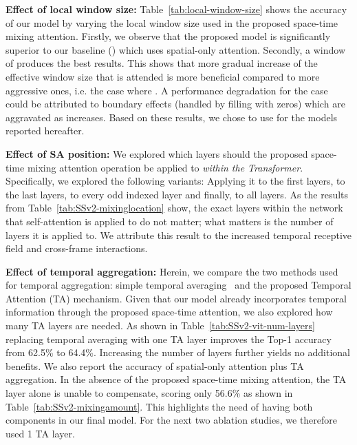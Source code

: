 \documentclass{article}
\begin{document}
\noindent\textbf{Effect of local window size:} Table~\ref{tab:local-window-size} shows the accuracy of our model by varying the local window size  used in the proposed space-time mixing attention. Firstly, we observe that the proposed model is significantly superior to our baseline () which uses spatial-only attention. Secondly, a window of  produces the best results. This shows that more gradual increase of the effective window size that is attended is more beneficial compared to more aggressive ones, i.e. the case where . A performance degradation for the case  could be attributed to boundary effects (handled by filling with zeros) which are aggravated as  increases. Based on these results, we chose to use  for the models reported hereafter.

\noindent\textbf{Effect of SA position:} We explored which layers should the proposed space-time mixing attention operation be applied to \textit{within the Transformer}. Specifically, we explored the following variants: Applying it to the first  layers, to the last  layers, to every odd indexed layer and finally, to all layers. As the results from Table~\ref{tab:SSv2-mixinglocation} show, the exact layers within the network that self-attention is applied to do not matter; what matters is the number of layers it is applied to. We attribute this result to the increased temporal receptive field and cross-frame interactions.

\noindent\textbf{Effect of temporal aggregation:} Herein, we compare the two methods used for temporal aggregation: simple temporal averaging~\citep{wang2016temporal} and the proposed Temporal Attention (TA) mechanism. Given that our model already incorporates temporal information through the proposed space-time attention, we also explored how many TA layers are needed. As shown in Table~\ref{tab:SSv2-vit-num-layers} replacing temporal averaging with one TA layer improves the Top-1 accuracy from 62.5\% to 64.4\%. Increasing the number of layers further yields no additional benefits. We also report the accuracy of spatial-only attention plus TA aggregation. In the absence of the proposed space-time mixing attention, the TA layer alone is unable to compensate, scoring only 56.6\% as shown in Table~\ref{tab:SSv2-mixingamount}. This highlights the need of having both components in our final model. For the next two ablation studies, we therefore used 1 TA layer.
\end{document}
